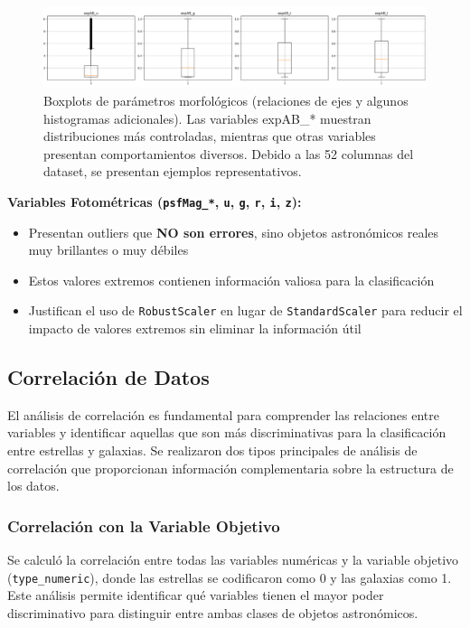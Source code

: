 \documentclass{article}
\begin{document}
\begin{figure}[H]
    \centering
    \includegraphics[width=1.0\linewidth]{boxplot_3.png}
    \caption{Boxplots de parámetros morfológicos (relaciones de ejes y algunos histogramas adicionales). Las variables expAB\_* muestran distribuciones más controladas, mientras que otras variables presentan comportamientos diversos. Debido a las 52 columnas del dataset, se presentan ejemplos representativos.}
    \label{fig:boxplot3}
\end{figure}


\textbf{Variables Fotométricas (\texttt{psfMag\_*}, \texttt{u}, \texttt{g}, \texttt{r}, \texttt{i}, \texttt{z}):}
\begin{itemize}
    \item Presentan outliers que \textbf{NO son errores}, sino objetos astronómicos reales muy brillantes o muy débiles
    \item Estos valores extremos contienen información valiosa para la clasificación
    \item Justifican el uso de \texttt{RobustScaler} en lugar de \texttt{StandardScaler} para reducir el impacto de valores extremos sin eliminar la información útil
\end{itemize}


\subsection{Correlación de Datos}

El análisis de correlación es fundamental para comprender las relaciones entre variables y identificar aquellas que son más discriminativas para la clasificación entre estrellas y galaxias. Se realizaron dos tipos principales de análisis de correlación que proporcionan información complementaria sobre la estructura de los datos.

\subsubsection{Correlación con la Variable Objetivo}

Se calculó la correlación entre todas las variables numéricas y la variable objetivo (\texttt{type\_numeric}), donde las estrellas se codificaron como 0 y 
las galaxias como 1. Este análisis permite identificar qué variables tienen el mayor poder discriminativo para distinguir entre ambas clases de objetos astronómicos.
\end{document}
